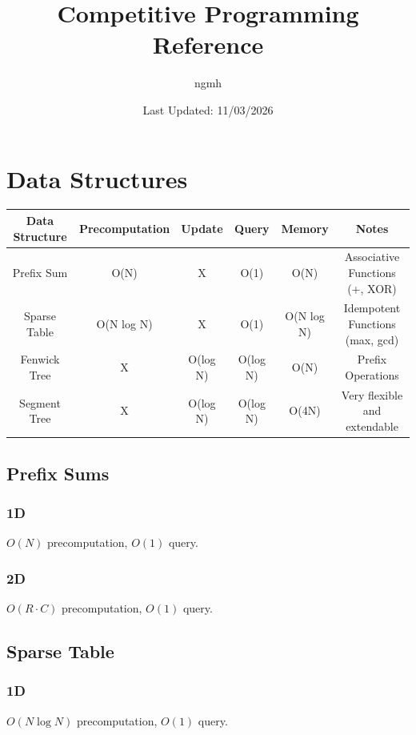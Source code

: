 \documentclass{article}
\title{Competitive Programming Reference}
\author{ngmh}
\date{Last Updated: 11/03/2026}
\begin{document}
\maketitle
\tableofcontents
\newpage

\section{Data Structures}
\begin{table}[H]
\begin{tabular}{|c|c|c|c|c|c|}
\hline
Data Structure & Precomputation & Update   & Query    & Memory     & Notes                           \\ \hline
Prefix Sum     & O(N)           & X        & O(1)     & O(N)       & Associative Functions (+, XOR)  \\ \hline
Sparse Table   & O(N log N)     & X        & O(1)     & O(N log N) & Idempotent Functions (max, gcd) \\ \hline
Fenwick Tree   & X              & O(log N) & O(log N) & O(N)       & Prefix Operations               \\ \hline
Segment Tree   & X              & O(log N) & O(log N) & O(4N)      & Very flexible and extendable    \\ \hline
\end{tabular}
\end{table}

\subsection{Prefix Sums}
\subsubsection{1D}
$O(N)$ precomputation, $O(1)$ query.


\subsubsection{2D}
$O(R\cdot C)$ precomputation, $O(1)$ query.


\subsection{Sparse Table}
\subsubsection{1D}
$O(N \log N)$ precomputation, $O(1)$ query.

\end{document}
